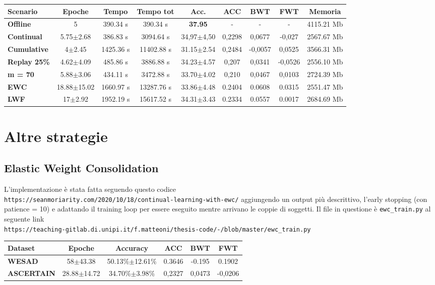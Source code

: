 \documentclass[11pt, a4paper, twoside, openright]{book}
\begin{document}
\begin{tabular}{l|c|c|c|c|c|c|c|c}
\textbf{Scenario} & \textbf{Epoche} & \textbf{Tempo} & \textbf{Tempo tot} & \textbf{Acc.} & \textbf{ACC} & \textbf{BWT} & \textbf{FWT} & \textbf{Memoria}\\
\hline
 \textbf{Offline} & 5 & 390.34 s & 390.34 s & \textbf{37.95} & - & - & - & 4115.21 Mb\\
\textbf{Continual} & 5.75$\pm$2.68 & 386.83 s & 3094.64 s & 34,97$\pm$4,50 & 0,2298 & 0,0677 & -0,027 & 2567.67 Mb\\
\textbf{Cumulative} & 4$\pm$2.45 & 1425.36 s & 11402.88 s & 31.15$\pm$2.54 & 0,2484 & -0,0057 & 0,0525 & 3566.31 Mb\\
\textbf{Replay 25\%} & 4.62$\pm$4.09 & 485.86 s & 3886.88 s & 34.23$\pm$4.57 & 0,207 & 0,0341 & -0,0526 & 2556.10 Mb\\
\textbf{m = 70} & 5.88$\pm$3.06 & 434.11 s & 3472.88 s & 33.70$\pm$4.02 & 0,210 & 0,0467 & 0,0103 & 2724.39 Mb\\
\textbf{EWC} & 18.88$\pm$15.02 & 1660.97 s & 13287.76 s & 33.86$\pm$4.48 & 0.2404 & 0.0608 & 0.0315 & 2551.47 Mb\\
\textbf{LWF} & 17$\pm$2.92 & 1952.19 s & 15617.52 s & 34.31$\pm$3.43 & 0.2334 & 0.0557 & 0.0017 & 2684.69 Mb\\
\end{tabular}
\section{Altre strategie}
\subsection{Elastic Weight Consolidation}
L'implementazione è stata fatta seguendo questo codice\\ \texttt{https://seanmoriarity.com/2020/10/18/continual-learning-with-ewc/}
aggiungendo un output più descrittivo, l'early stopping (con patience = 10) e adattando il training loop per essere eseguito mentre arrivano le coppie di soggetti. Il file in questione è \texttt{ewc\_train.py} al seguente link\\ \texttt{https://teaching-gitlab.di.unipi.it/f.matteoni/thesis-code/-/blob/master/ewc\_train.py}
\begin{tabular}{l|c|c|c|c|c}
    \textbf{Dataset} & \textbf{Epoche} & \textbf{Accuracy} & \textbf{ACC} & \textbf{BWT} & \textbf{FWT} \\
    \hline 
    \textbf{WESAD} & 58$\pm$43.38 & 50.13\%$\pm$12.61\% & 0.3646 & -0.195 & 0.1902\\
    \textbf{ASCERTAIN} & 28.88$\pm$14.72 & 34.70\%$\pm$3.98\% & 0,2327 & 0,0473 & -0,0206
\end{tabular}
\end{document}
